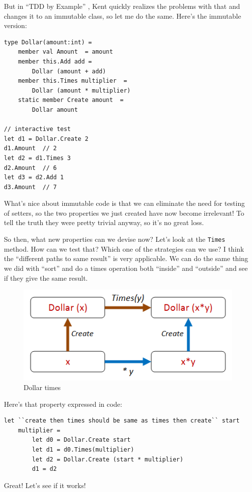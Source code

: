 But in ``TDD by Example'' , Kent quickly realizes the problems with that
and changes it to an immutable class, so let me do the same.
Here's the immutable version:

\begin{verbatim}
type Dollar(amount:int) =
	member val Amount  = amount 
	member this.Add add = 
		Dollar (amount + add)
	member this.Times multiplier  = 
		Dollar (amount * multiplier)
	static member Create amount  = 
		Dollar amount  
	
// interactive test
let d1 = Dollar.Create 2
d1.Amount  // 2
let d2 = d1.Times 3 
d2.Amount  // 6
let d3 = d2.Add 1
d3.Amount  // 7
\end{verbatim}
What's nice about immutable code is that we can eliminate the need for
testing of setters, so the two properties we just created have now
become irrelevant!
To tell the truth they were pretty trivial anyway, so it's no great
loss.

So then, what new properties can we devise now?
Let's look at the \texttt{Times} method. How can we test that? Which one
of the strategies can we use?
I think the ``different paths to same result'' is very applicable. We
can do the same thing we did with ``sort'' and do a times operation both
``inside'' and ``outside'' and see if they give the same result.

\begin{figure}[htbp]
\centering
\includegraphics{pics/property_dollar_times.png}
\caption{Dollar times}
\end{figure}

Here's that property expressed in code:

\begin{verbatim}
let ``create then times should be same as times then create`` start 
    multiplier = 
        let d0 = Dollar.Create start
        let d1 = d0.Times(multiplier)
        let d2 = Dollar.Create (start * multiplier)     
        d1 = d2
\end{verbatim}
Great! Let's see if it works!

